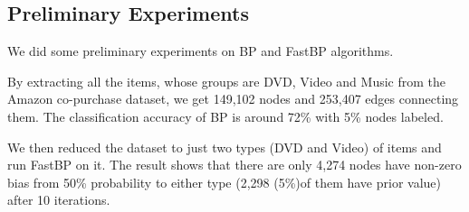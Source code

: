  \subsection{Preliminary Experiments}
We did some preliminary experiments on BP and FastBP algorithms.

By extracting all the items, whose groups are DVD, Video and Music from the Amazon co-purchase dataset, we get 149,102 nodes and 253,407 edges connecting them.
The classification accuracy of BP is around 72\% with 5\% nodes labeled.

We then reduced the dataset to just two types (DVD and Video) of items and run FastBP on it.
The result shows that there are only 4,274 nodes have non-zero bias from 50\% probability to either type (2,298 (5\%)of them have prior value) after 10 iterations.
